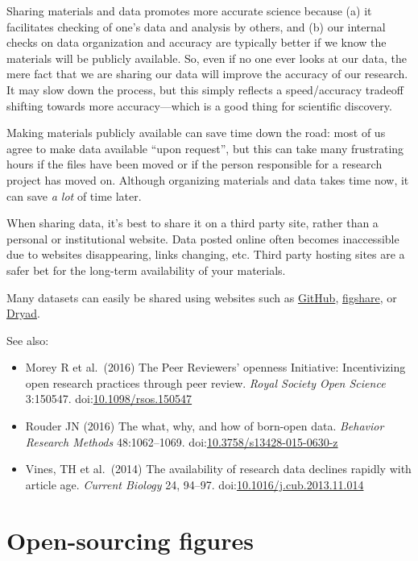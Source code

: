 \documentclass[letterpaper,oneside,11pt,article, portrait]{memoir}
\newcommand{\doi}[1]{doi:\href{http://dx.doi.org/#1}{#1}}
\newcommand{\journal}[1]{\textit{#1}} 			%
\begin{document}
Sharing materials and data promotes more accurate science because (a) it facilitates checking of one's data and analysis by others, and (b) our internal checks on data organization and accuracy are typically better if we know the materials will be publicly available. So, even if no one ever looks at our data, the mere fact that we are sharing our data will improve the accuracy of our research. It may slow down the process, but this simply reflects a speed/accuracy tradeoff shifting towards more accuracy---which is a good thing for scientific discovery.

Making materials publicly available can save time down the road: most of us agree to make data available ``upon request'', but this can take many frustrating hours if the files have been moved or if the person responsible for a research project has moved on. Although organizing materials and data takes time now, it can save \textit{a lot} of time later.

When sharing data, it's best to share it on a third party site, rather than a personal or institutional website. Data posted online often becomes inaccessible due to websites disappearing, links changing, etc. Third party hosting sites are a safer bet for the long-term availability of your materials.

Many datasets can easily be shared using websites such as \href{https://github.com}{GitHub}, \href{https://figshare.com}{figshare}, or \href{https://datadryad.org/}{Dryad}. 

\vspace{1em} \noindent See also:

\begin{itemize}
\item Morey R et al.\ (2016) The Peer Reviewers' openness Initiative: Incentivizing open research practices through peer review. \journal{Royal Society Open Science} 3:150547. \doi{10.1098/rsos.150547}
\item Rouder JN (2016) The what, why, and how of born-open data. \journal{Behavior Research Methods} 48:1062--1069. \doi{10.3758/s13428-015-0630-z}
\item Vines, TH et al.\ (2014) The availability of research data declines rapidly with article age. \journal{Current Biology} 24, 94--97. \doi{10.1016/j.cub.2013.11.014}
\end{itemize}

\chapter{Open-sourcing figures} \label{CCFigure}
\end{document}

